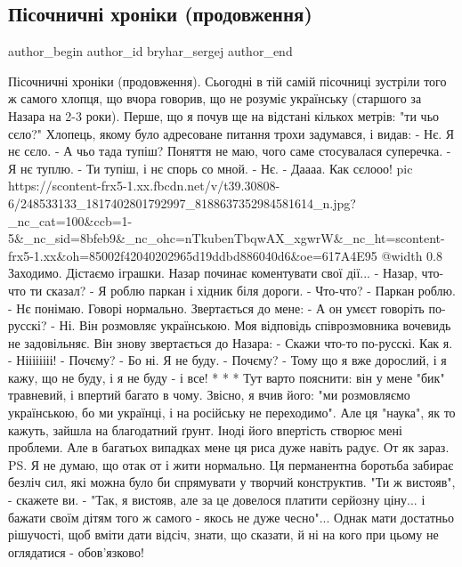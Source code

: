  
 
 
 
 
 
\subsection{Пісочничні хроніки (продовження)}
\label{sec:24_10_2021.fb.bryhar_sergej.1.pesochnica_jazyk_mova}
 
\ifcmt
 author_begin
   author_id bryhar_sergej
 author_end
\fi

\obeycr
Пісочничні хроніки (продовження).
Сьогодні в тій самій пісочниці зустріли того ж самого хлопця, що вчора говорив, що не розуміє українську (старшого за Назара на 2-3 роки).
Перше, що я почув ще на відстані кількох метрів: "ти чьо сєло?"
Хлопець, якому було адресоване питання трохи задумався, і видав:
- Нє. Я нє сєло.
- А чьо тада тупіш?
Поняття не маю, чого саме стосувалася суперечка.
- Я нє туплю.
- Ти тупіш, і нє спорь со мной.
- Нє.
- Даааа. Как сєлооо!
\restorecr
\ifcmt
  pic https://scontent-frx5-1.xx.fbcdn.net/v/t39.30808-6/248533133_1817402801792997_8188637352984581614_n.jpg?_nc_cat=100&ccb=1-5&_nc_sid=8bfeb9&_nc_ohc=nTkubenTbqwAX_xgwrW&_nc_ht=scontent-frx5-1.xx&oh=85002f42040202965d19ddbd886040d6&oe=617A4E95
  @width 0.8
\fi
\obeycr
Заходимо. Дістаємо іграшки. Назар починає коментувати свої дії...
- Назар, что-что ти сказал?  
- Я роблю паркан і хідник біля дороги.
- Что-что?
- Паркан роблю.
- Нє понімаю. Говорі нормально.
Звертається до мене:
- А он умєєт говоріть по-русскі?
- Ні. Він розмовляє українською.
Моя відповідь співрозмовника вочевидь не задовільняє. Він знову звертається до Назара:
- Скажи что-то по-русскі. Как я.
- Ніііііііі!
- Почєму?
- Бо ні. Я не буду.
- Почєму?
- Тому що я вже дорослий, і я кажу, що не буду, і я не буду - і все!
* * *
Тут варто пояснити: він у мене "бик" травневий, і впертий багато в чому. 
Звісно, я вчив його: "ми розмовляємо українською, бо ми українці, і на російську не переходимо". Але ця "наука", як то кажуть, зайшла на благодатний ґрунт. 
Іноді його впертість створює мені проблеми.
Але в багатьох випадках мене ця риса дуже навіть радує. От як зараз.
PS. Я не думаю, що отак от і жити нормально. Ця перманентна боротьба забирає безліч сил, які можна було би спрямувати у творчий конструктив. "Ти ж вистояв", - скажете ви. - "Так, я вистояв, але за це довелося платити серйозну ціну... і бажати своїм дітям того ж самого - якось не дуже чесно"...
Однак мати достатньо рішучості, щоб вміти дати відсіч, знати, що сказати, й ні на кого при цьому не оглядатися - обов'язково!
\restorecr

